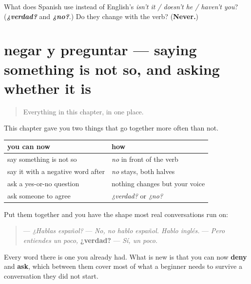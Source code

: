 \begin{tcolorbox}[breakable,colback=teal!4,colframe=teal!35!black,title={Before you move on}]
What does Spanish use instead of English's \emph{isn't it / doesn't he / haven't you}? (\emph{\textbf{¿verdad?}} and \emph{\textbf{¿no?}}.) Do they change with the verb? (\textbf{Never.})
\end{tcolorbox}
\section[Practice]{negar y preguntar — saying something is not so, and asking whether it is}

\label{lesson:ES-C267-negar-preguntar}



\begin{quote}
Everything in this chapter, in one place.
\end{quote}

\begin{grammarlens}[title={Grammar lens: saying something is not so, and asking whether it is}]
This chapter gave you two things that go together more often than not.

\noindent
\begin{tabularx}{\linewidth}{@{}>{\raggedright\arraybackslash}X>{\raggedright\arraybackslash}X@{}}
\toprule
\textbf{you can now} & \textbf{how} \\
\midrule
say something is not so & \emph{no} in front of the verb \\
say it with a negative word after & \emph{no} stays, both halves \\
ask a yes-or-no question & nothing changes but your voice \\
ask someone to agree & \emph{¿verdad?} or \emph{¿no?} \\
\bottomrule
\end{tabularx}

Put them together and you have the shape most real conversations run on:

\begin{quote}
— \emph{¿Hablas español?} — \emph{No, no hablo español. Hablo inglés.} — \emph{Pero entiendes un poco,} \textbf{¿verdad?} — \emph{Sí, un poco.}
\end{quote}

Every word there is one you already had. What is new is that you can now \textbf{deny} and \textbf{ask}, which between them cover most of what a beginner needs to survive a conversation they did not start.
\end{grammarlens}

